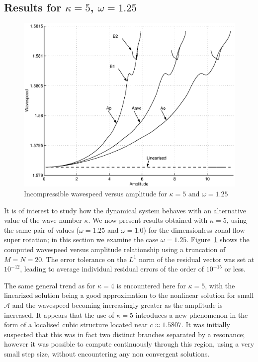 \subsection[Results for $\kappa=5$, $\omega=1.25$]{Results for \boldmath$\kappa=5$, $\omega=1.25$}
\label{subsec:incomnlk5w125}
\begin{figure}[htbp]
	\centering
		\includegraphics[scale=0.75]{IMAGES/CvsAk5w125.eps}
	\caption{Incompressible wavespeed versus amplitude for $\kappa=5$ and $\omega=1.25$}
	\label{fig:CvsAk5w125}
\end{figure}

It is of interest to study how the dynamical system behaves with an alternative value of the wave number $\kappa$. We now present results obtained with $\kappa=5$, using the same pair of values ($\omega=1.25$ and $\omega=1.0$) for the dimensionless zonal flow super rotation; in this section we examine the case $\omega=1.25$. Figure~\ref{fig:CvsAk5w125} shows the computed wavespeed versus amplitude relationship using a truncation of $M=N=20$. The error tolerance on the $L^1$ norm of the residual vector was set at $10^{-12}$, leading to average individual residual errors of the order of $10^{-15}$ or less.

The same general trend as for $\kappa=4$ is encountered here for $\kappa=5$, with the linearized solution being a good approximation to the nonlinear solution for small $\mathcal{A}$ and the wavespeed becoming increasingly greater as the amplitude is increased. It appears that the use of $\kappa=5$ introduces a new phenomenon in the form of a localised cubic structure located near $c\approx1.5807$. It was initially suspected that this was in fact two distinct branches separated by a resonance; however it was possible to compute continuously through this region, using a very small step size, without encountering any non convergent solutions. 

